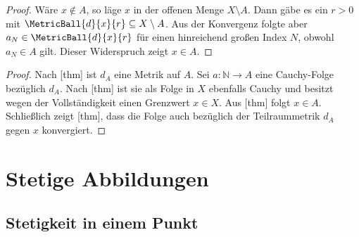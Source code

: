 \documentclass[main.tex]{subfiles}
\begin{document}
\begin{proof}
Wäre \(x\notin A\), so läge \(x\) in der offenen Menge
\(X\setminus A\). Dann gäbe es ein \(r>0\) mit
\(\MetricBall{d}{x}{r}\subseteq X\setminus A\). Aus der Konvergenz folgte
aber \(a_N\in\MetricBall{d}{x}{r}\) für einen hinreichend großen Index
\(N\), obwohl \(a_N\in A\) gilt. Dieser Widerspruch zeigt \(x\in A\).
\end{proof}

\begin{proof}
Nach [thm] ist \(d_A\) eine
Metrik auf \(A\). Sei \(a\colon\mathbb N\to A\) eine Cauchy-Folge bezüglich
\(d_A\). Nach [thm] ist sie als
Folge in \(X\) ebenfalls Cauchy und besitzt wegen der Vollständigkeit einen
Grenzwert \(x\in X\). Aus
[thm] folgt \(x\in A\).
Schließlich zeigt [thm], dass
die Folge auch bezüglich der Teilraummetrik \(d_A\) gegen \(x\) konvergiert.
\end{proof}

\chapter{Stetige Abbildungen}

\section{Stetigkeit in einem Punkt}
\end{document}
